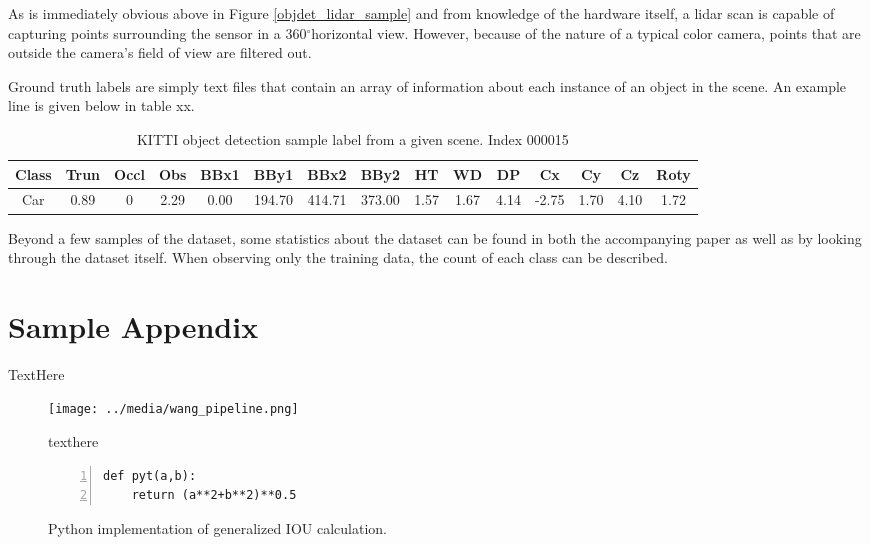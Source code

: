 \def \DEG{$^{\circ}$} %

As is immediately obvious above in Figure \ref{objdet_lidar_sample} and from knowledge of the hardware itself, a lidar scan is capable of capturing points surrounding the sensor in a 360\DEG horizontal view. However, because of the nature of a typical color camera, points that are outside the camera's field of view are filtered out. 

Ground truth labels are simply text files that contain an array of information about each instance of an object in the scene. An example line is given below in table xx. 


\begin{table}[h]
\centering
\caption{KITTI object detection sample label from a given scene. Index 000015}
\begin{tabular}{|c|c|c|c|c|c|c|c|c|c|c|c|c|c|c|}
\hline
Class & Trun & Occl & Obs  & BBx1  & BBy1   & BBx2   & BBy2   & HT & WD & DP & Cx    & Cy   & Cz   & Roty \\
\hline
Car   & 0.89       & 0         & 2.29 & 0.00  & 194.70 & 414.71 & 373.00 & 1.57   & 1.67  & 4.14  & -2.75 & 1.70 & 4.10 & 1.72 \\

\hline
\end{tabular}
\label{Mathematical Symbols}
\end{table}


Beyond a few samples of the dataset, some statistics about the dataset can be found in both the accompanying paper as well as by looking through the dataset itself. When observing only the training data, the count of each class can be described. 







\newpage
\section{Sample Appendix}
TextHere

\begin{figure}[h] %
    \texttt{[image: ../media/wang\_pipeline.png]}
    \caption{texthere}
    \label{delme_figure} %
\end{figure}


\begin{figure}[h] %
\begin{lstlisting}[numbers=left]
def pyt(a,b):
    return (a**2+b**2)**0.5
\end{lstlisting}
\onehalfspacing %
\caption{Python implementation of generalized IOU calculation.}
\label{delme_code} %
\end{figure}

